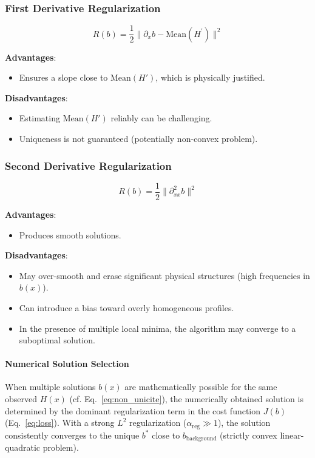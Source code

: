 \documentclass{article}
\begin{document}
\subsubsection{First Derivative Regularization}
\[
R(b) = \frac{1}{2}\|\partial_x b - \text{Mean}(H^{\prime})\|^2
\]

\textbf{Advantages}:
\begin{itemize}
\item Ensures a slope close to \( \text{Mean}(H') \), which is physically justified.
\end{itemize}

\textbf{Disadvantages}:
\begin{itemize}
    \item Estimating \( \text{Mean}(H') \) reliably can be challenging.
    \item Uniqueness is not guaranteed (potentially non-convex problem).
\end{itemize}

\subsubsection{Second Derivative Regularization}
\[
R(b) = \frac{1}{2}\|\partial_{xx}^2 b\|^2
\]

\textbf{Advantages}:
\begin{itemize}
\item Produces smooth solutions.
\end{itemize}

\textbf{Disadvantages}:
\begin{itemize}
    \item May over-smooth and erase significant physical structures (high frequencies in \( b(x) \)).
    \item Can introduce a bias toward overly homogeneous profiles.
    \item In the presence of multiple local minima, the algorithm may converge to a suboptimal solution.
\end{itemize}

\paragraph{Numerical Solution Selection}
When multiple solutions \( b(x) \) are mathematically possible for the same observed \( H(x) \) (cf. Eq.~\ref{eq:non_unicite}), the numerically obtained solution is determined by the dominant regularization term in the cost function \( J(b) \) (Eq.~\ref{eq:loss}). With a strong \( L^2 \) regularization (\( \alpha_{\text{reg}} \gg 1 \)), the solution consistently converges to the unique \( b^* \) close to \( b_{\text{background}} \) (strictly convex linear-quadratic problem).
\end{document}
